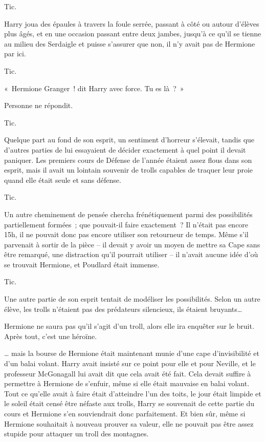 Tic.

Harry joua des épaules à travers la foule serrée, passant à côté ou autour d'élèves plus âgés, et en une occasion passant entre deux jambes, jusqu'à ce qu'il se tienne au milieu des Serdaigle et puisse s'assurer que non, il n'y avait pas de Hermione par ici.

Tic.

«~Hermione Granger~! dit Harry avec force.
Tu es là~?~»

Personne ne répondit.

Tic.

Quelque part au fond de son esprit, un sentiment d'horreur s'élevait, tandis que d'autres parties de lui essayaient de décider exactement à quel point il devait paniquer.
Les premiers cours de Défense de l'année étaient assez flous dans son esprit, mais il avait un lointain souvenir de trolls capables de traquer leur proie quand elle était seule et sans défense.

Tic.

Un autre cheminement de pensée chercha frénétiquement parmi des possibilités partiellement formées~; que pouvait-il faire exactement~?
Il n'était pas encore 15h, il ne pouvait donc pas encore utiliser son retourneur de temps.
Même s'il parvenait à sortir de la pièce -- il devait y avoir un moyen de mettre sa Cape sans être remarqué, une distraction qu'il pourrait utiliser -- il n'avait aucune idée d'où se trouvait Hermione, et Poudlard était immense.

Tic.

Une autre partie de son esprit tentait de modéliser les possibilités.
Selon un autre élève, les trolls n'étaient pas des prédateurs silencieux, ils étaient bruyants…

Hermione ne saura pas qu'il s'agit d'un troll, alors elle ira enquêter sur le bruit.
Après tout, c'est une héroïne.

… mais la bourse de Hermione était maintenant munie d'une cape d'invisibilité et d'un balai volant.
Harry avait insisté sur ce point pour elle et pour Neville, et le professeur McGonagall lui avait dit que cela avait été fait.
Cela devait suffire à permettre à Hermione de s'enfuir, même si elle était mauvaise en balai volant.
Tout ce qu'elle avait à faire était d'atteindre l'un des toits, le jour était limpide et le soleil était censé être néfaste aux trolls, Harry se souvenait de cette partie du cours et Hermione s'en souviendrait donc parfaitement.
Et bien sûr, même si Hermione souhaitait à nouveau prouver sa valeur, elle ne pouvait pas être assez stupide pour attaquer un troll des montagnes.

